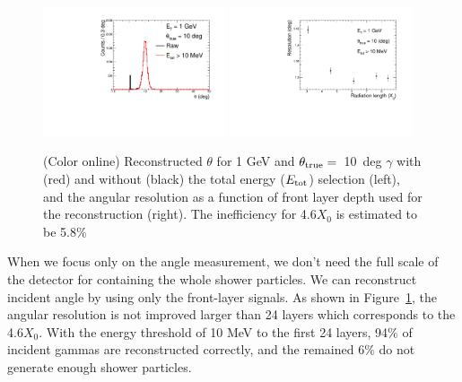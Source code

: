 \documentclass[jkps,preprint,fleqn,showpacs,showkeys]{revtex4}
\begin{document}
\begin{figure}[!hbt]
\includegraphics[width=0.48\textwidth]{figures/Fig3_reco_layer_hist.pdf}
\includegraphics[width=0.48\textwidth]{figures/Fig3_reco_layer_graph.pdf}
\caption{ (Color online) Reconstructed $\theta$ for 1 GeV and $\theta_{\rm{true}}=$~10~deg $\gamma$ with (red) and without (black) the total energy ($E_{\rm{tot}}$) selection (left), and the angular resolution as a function of front layer depth used for the reconstruction (right). The inefficiency for 4.6$X_{0}$ is estimated to be 5.8\%  }
\label{fig:angle_reco_layer}
\end{figure}

When we focus only on the angle measurement, we don't need the full scale of the detector for containing the whole shower particles. We can reconstruct incident angle by using only the front-layer signals. %
As shown in Figure~\ref{fig:angle_reco_layer}, the angular resolution is not improved larger than 24 layers which corresponds to the 4.6$X_{0}$. With the energy threshold of 10 MeV to the first 24 layers, 94$\%$ of incident gammas are reconstructed correctly, and the remained 6$\%$ do not generate enough shower particles.
\end{document}
